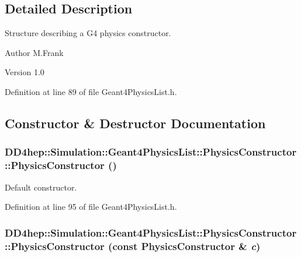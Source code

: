 \subsection{Detailed Description}
Structure describing a G4 physics constructor. \begin{DoxyAuthor}{Author}
M.Frank 
\end{DoxyAuthor}
\begin{DoxyVersion}{Version}
1.0 
\end{DoxyVersion}


Definition at line 89 of file Geant4PhysicsList.h.

\subsection{Constructor \& Destructor Documentation}
\hypertarget{class_d_d4hep_1_1_simulation_1_1_geant4_physics_list_1_1_physics_constructor_a3c66a1cc69a9c2b3d8a4c2febcd17ceb}{
\subsubsection[{PhysicsConstructor}]{\setlength{\rightskip}{0pt plus 5cm}DD4hep::Simulation::Geant4PhysicsList::PhysicsConstructor::PhysicsConstructor ()}}
\label{class_d_d4hep_1_1_simulation_1_1_geant4_physics_list_1_1_physics_constructor_a3c66a1cc69a9c2b3d8a4c2febcd17ceb}


Default constructor. 

Definition at line 95 of file Geant4PhysicsList.h.\hypertarget{class_d_d4hep_1_1_simulation_1_1_geant4_physics_list_1_1_physics_constructor_a6dd26f324ed74b412c93e8d555939c68}{
\subsubsection[{PhysicsConstructor}]{\setlength{\rightskip}{0pt plus 5cm}DD4hep::Simulation::Geant4PhysicsList::PhysicsConstructor::PhysicsConstructor (const {\bf PhysicsConstructor} \& {\em c})}}
\label{class_d_d4hep_1_1_simulation_1_1_geant4_physics_list_1_1_physics_constructor_a6dd26f324ed74b412c93e8d555939c68}


